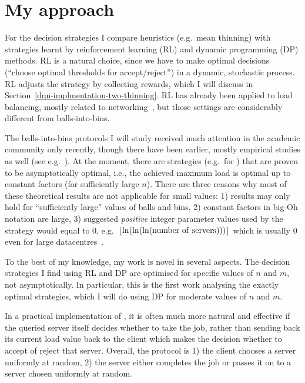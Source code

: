 \section{My approach} \label{my-approach}
For the decision strategies I compare heuristics (e.g.\ mean thinning) with strategies learnt by reinforcement learning (RL) and dynamic programming (DP) methods. RL is a natural choice, since we have to make optimal decisions (``choose optimal thresholds for accept/reject'') in a dynamic, stochastic process. RL adjusts the strategy by collecting rewards, which I will discuss in Section~\ref{dqn-implmentation-two-thinning}. RL has already been applied to load balancing, mostly related to networking~\cite{attiah2020RLcellular, yeo2021controller}, but those settings are considerably different from balls-into-bins.


The balls-into-bins protocols I will study received much attention in the academic community only recently, though there have been earlier, mostly empirical studies as well (see e.g.~\cite{derek1986twothinningfirstattempt}). At the moment, there are strategies (e.g.\ for \TwoThinning) that are proven to be asymptotically optimal, i.e., the achieved maximum load is optimal up to constant factors (for sufficiently large $n$). There are three reasons why most of these theoretical results are not applicable for small values: 1) results may only hold for ``sufficiently large'' values of balls and bins, 2) constant factors in big-Oh notation are large, 3) suggested \textit{positive} integer parameter values used by the strategy would equal to $0$, e.g.\ $\floor{\ln(\ln(\ln(\mathrm{number\ of\ servers})))}$ which is usually $0$ even for large datacentres~\cite{uzaman2019datacentresize}.


To the best of my knowledge, my work is novel in several aspects. The decision strategies I find using RL and DP are optimised for specific values of $n$ and $m$, not asymptotically. In particular, this is the first work analysing the exactly optimal strategies, which I will do using DP for moderate values of $n$ and $m$.


In a practical implementation of \TwoThinning, it is often much more natural and effective if the queried server itself decides whether to take the job, rather than sending back its current load value back to the client which makes the decision whether to accept of reject that server. Overall, the protocol is 1) the client chooses a server uniformly at random, 2) the server either completes the job or passes it on to a server chosen uniformly at random.

